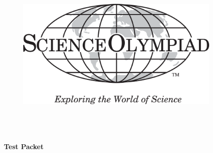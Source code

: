 \documentclass{exam-scioly-araneesh}
\newcommand{\printdoctype}{Test Packet}
\begin{document}
\begin{center}
\vspace*{1em}
{\Huge \textbf{
        \printtournament\\
        \printdate\\
        \vspace{4mm}
    }
}
\begin{figure}[h]
    \centering
    \includegraphics[width=4in,height=3in,keepaspectratio]{images/logo.png}
\end{figure}
{\Huge \textbf{
        \printevent\\
        \printdoctype\\
        \vspace{4mm}
    }
}
{\Large \textbf{\printauthor} \\ \vspace{4mm}}
\end{center}
\end{document}

